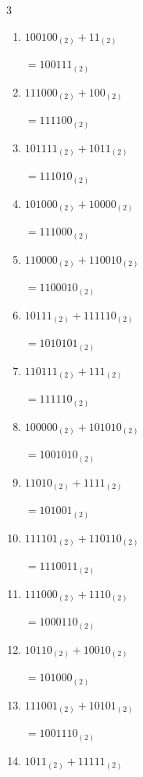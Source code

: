 \begin{multicols}{3}
\begin{enumerate}
        $=1001100_{(2)}$

  \item $100100_{(2)} + 11_{(2)}$

        $=100111_{(2)}$

  \item $111000_{(2)} + 100_{(2)}$

        $=111100_{(2)}$

  \item $101111_{(2)} + 1011_{(2)}$

        $=111010_{(2)}$

  \item $101000_{(2)} + 10000_{(2)}$

        $=111000_{(2)}$

  \item $110000_{(2)} + 110010_{(2)}$

        $=1100010_{(2)}$

  \item $10111_{(2)} + 111110_{(2)}$

        $=1010101_{(2)}$

  \item $110111_{(2)} + 111_{(2)}$

        $=111110_{(2)}$

  \item $100000_{(2)} + 101010_{(2)}$

        $=1001010_{(2)}$

\columnbreak %

  \item $11010_{(2)} + 1111_{(2)}$

        $=101001_{(2)}$

  \item $111101_{(2)} + 110110_{(2)}$

        $=1110011_{(2)}$

  \item $111000_{(2)} + 1110_{(2)}$

        $=1000110_{(2)}$

  \item $10110_{(2)} + 10010_{(2)}$

        $=101000_{(2)}$

  \item $111001_{(2)} + 10101_{(2)}$

        $=1001110_{(2)}$

  \item $1011_{(2)} + 11111_{(2)}$


\end{enumerate}
\end{multicols}
